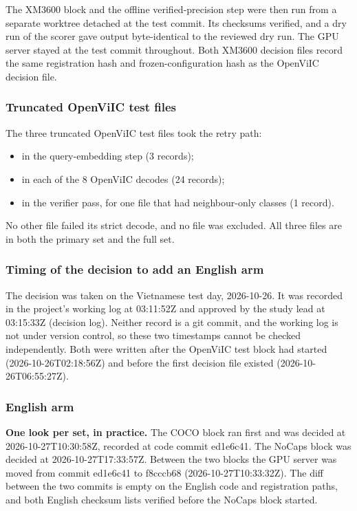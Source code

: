 \documentclass[manuscript,screen]{acmart}
\providecommand{\tightlist}{\setlength{\itemsep}{0pt}\setlength{\parskip}{0pt}}
\begin{document}
The XM3600 block and the offline verified-precision step were then run from a separate worktree
detached at the test commit. Its checksums verified, and a dry run of the scorer gave output
byte-identical to the reviewed dry run. The GPU server stayed at the test commit throughout. Both
XM3600 decision files record the same registration hash and frozen-configuration hash as the
OpenViIC decision file.

\subsubsection{Truncated OpenViIC test files}\label{truncated-openviic-test-files}

The three truncated OpenViIC test files took the retry path:

\begin{itemize}
\tightlist
\item
  in the query-embedding step (3 records);
\item
  in each of the 8 OpenViIC decodes (24 records);
\item
  in the verifier pass, for one file that had neighbour-only classes (1 record).
\end{itemize}

No other file failed its strict decode, and no file was excluded. All three files are in both the
primary set and the full set.

\subsubsection{Timing of the decision to add an English
arm}\label{timing-of-the-decision-to-add-an-english-arm}

The decision was taken on the Vietnamese test day, 2026-10-26. It was recorded in the project's
working log at 03:11:52Z and approved by the study lead at 03:15:33Z (decision log). Neither record
is a git commit, and the working log is not under version control, so these two timestamps cannot be
checked independently. Both were written after the OpenViIC test block had started
(2026-10-26T02:18:56Z) and before the first decision file existed (2026-10-26T06:55:27Z).

\subsubsection{English arm}\label{english-arm}

\textbf{One look per set, in practice.} The COCO block ran first and was decided at
2026-10-27T10:30:58Z, recorded at code commit ed1e6c41. The NoCaps block was decided at
2026-10-27T17:33:57Z. Between the two blocks the GPU server was moved from commit ed1e6c41 to
f8cccb68 (2026-10-27T10:33:32Z). The diff between the two commits is empty on the English code and
registration paths, and both English checksum lists verified before the NoCaps block started.
\end{document}
